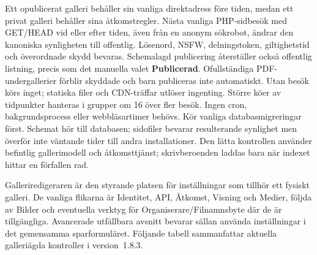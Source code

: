 \documentclass[11pt,a4paper]{article}
\newcommand{\version}{1.8.3}
\newcommand{\ui}[1]{\textbf{#1}}
\begin{document}
Ett opublicerat galleri behåller sin vanliga direktadress före tiden,
medan ett privat galleri behåller sina åtkomstregler. Nästa vanliga
PHP-sidbesök med GET/HEAD vid eller efter tiden, även från en anonym
sökrobot, ändrar den kanoniska synligheten till offentlig.
Lösenord, NSFW, delningstoken, giltighetstid och överordnade skydd bevaras.
Schemalagd publicering återställer också offentlig listning, precis som
det manuella valet \ui{Publicerad}.
Ofullständiga PDF-undergallerier förblir skyddade och barn publiceras inte
automatiskt. Utan besök körs inget; statiska filer och CDN-träffar utlöser
ingenting. Större köer av tidpunkter hanteras i grupper om 16 över fler besök.
Ingen cron, bakgrundsprocess eller webbläsartimer behövs.
Kör vanliga databasmigreringar först. Schemat hör till databasen; sidofiler
bevarar resulterande synlighet men överför inte väntande tider till
andra installationer.
Den lätta kontrollen använder befintlig gallerimodell och åtkomsttjänst;
skrivberoenden laddas bara när indexet hittar en förfallen rad.


Galleriredigeraren är den styrande platsen för inställningar som tillhör ett
fysiskt galleri. De vanliga flikarna är Identitet, API, Åtkomst, Visning och
Medier, följda av Bilder och eventuella verktyg för Organiserare/Filnamnsbyte
där de är tillgängliga. Avancerade utfällbara avsnitt bevarar sällan använda
inställningar i det gemensamma sparformuläret. Följande tabell sammanfattar
aktuella galleriägda kontroller i version~\version{}.
\end{document}
